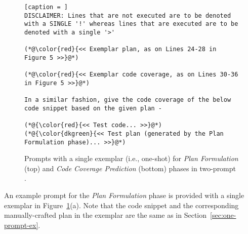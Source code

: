\begin{figure}[t]
\begin{minipage}{.45\textwidth}
\begin{lstlisting}[caption = ]
DISCLAIMER: Lines that are not executed are to be denoted with a SINGLE '!' whereas lines that are executed are to be denoted with a single '>'

(*@\color{red}{<< Exemplar plan, as on Lines 24-28 in Figure 5 >>}@*) 

(*@\color{red}{<< Exemplar code coverage, as on Lines 30-36 in Figure 5 >>}@*) 

In a similar fashion, give the code coverage of the below code snippet based on the given plan - 

(*@{\color{red}{<< Test code... >>}@*)
(*@{\color{dkgreen}{<< Test plan (generated by the Plan Formulation phase)... >>}@*)

\end{lstlisting}
\vspace{-9pt}
\label{fig:example-plan-cc-prediction}
\end{minipage}
\vspace{-9pt}
\caption{Prompts with a single exemplar (i.e., one-shot) for \textit{Plan Formulation} (top) and \textit{Code Coverage Prediction} (bottom) phases in two-prompt {\tool}.}
\label{fig:example}
\end{figure}

An example prompt for the \textit{Plan Formulation} phase is provided with a single exemplar in Figure~\ref{fig:example}(a). 
Note that the code snippet and the corresponding manually-crafted plan in the exemplar are the same as in Section~\ref{sec:one-prompt-ex}. 

